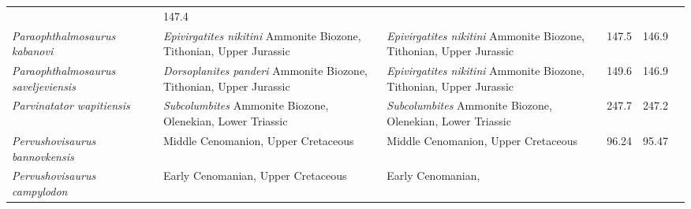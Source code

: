 \begin{longtabu}{>{\itshape}lXXSSl}
                                                                        & 147.4
                                                                        &
                                                                        \cite{Druckenmiller2012NJG} \\             
	Paraophthalmosaurus kabanovi                         &
        \emph{Epivirgatites nikitini} Ammonite Biozone, Tithonian, Upper
        Jurassic                                                          &
        \emph{Epivirgatites nikitini} Ammonite Biozone, Tithonian, Upper
        Jurassic                                                          &
        147.5                    & 146.9                    & \cite{Efimov1999PZ} \\                    
	Paraophthalmosaurus saveljeviensis                   &
        \emph{Dorsoplanites panderi} Ammonite Biozone, Tithonian, Upper Jurassic
                                                             &
        \emph{Epivirgatites nikitini} Ammonite Biozone, Tithonian, Upper
        Jurassic                                                          &
        149.6                    & 146.9                    &
        \cite{Arkhangelsky1997PZ} \\               
	Parvinatator wapitiensis                             &
        \emph{Subcolumbites} Ammonite Biozone, Olenekian, Lower Triassic
                                                             &
        \emph{Subcolumbites} Ammonite Biozone, Olenekian, Lower Triassic
                                                             & 247.7
                                                             & 247.2
                                                             &
                                                             \cite{Nicholls1995Vfateosc} \\                   
	Pervushovisaurus bannovkensis                        & Middle
        Cenomanion, Upper Cretaceous
                                                             & Middle
        Cenomanion, Upper Cretaceous
                                                             & 96.24
                                                             & 95.47
                                                             &
                                                             \cite{Fischer2014ZJLS} \\                   
	Pervushovisaurus campylodon                          & Early Cenomanian,
        Upper Cretaceous
                                                             & Early Cenomanian,

\end{longtabu}
